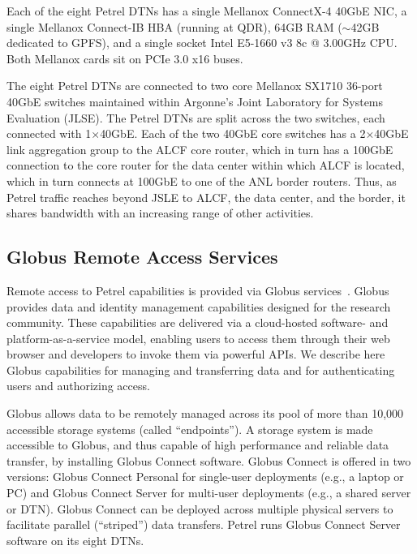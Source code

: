 \documentclass[sigconf]{acmart}
\begin{document}
Each of the eight Petrel DTNs has a single Mellanox ConnectX-4 40GbE NIC, a single Mellanox Connect-IB HBA (running at QDR), 64GB RAM ($\sim$42GB dedicated to GPFS), and a single socket Intel E5-1660 v3 8c @ 3.00GHz CPU. 
Both Mellanox cards sit on PCIe 3.0 x16 buses.

The eight Petrel DTNs are connected to two core Mellanox SX1710 36-port 40GbE switches
maintained within Argonne's Joint Laboratory for Systems Evaluation (JLSE).
The Petrel DTNs are split across the two switches, each connected with 1$\times$40GbE. 
Each of the two 40GbE core switches has a 2$\times$40GbE link aggregation group to the ALCF core router, which in turn has a 100GbE connection to the core router for the data center within
which ALCF is located,
which in turn connects at 100GbE to one of the ANL border routers.
Thus, as Petrel traffic reaches beyond JSLE to ALCF, the data center, and the border,
it shares bandwidth with an increasing range of other activities.

\subsection{Globus Remote Access Services}

Remote access to Petrel capabilities
is provided via Globus services~\cite{Globus2016}.
Globus provides data and identity management capabilities designed for the research community. 
These capabilities are delivered via a cloud-hosted software- and platform-as-a-service model, 
enabling users to access them through their web browser and
developers to invoke them via powerful APIs. 
We describe here Globus capabilities for managing and transferring data and for authenticating users and authorizing access.

Globus allows data to be remotely managed across its pool of more than 10,000 accessible storage systems (called ``endpoints''). 
A storage system is made accessible to Globus, and thus capable of high performance and reliable data transfer, by installing Globus Connect software. 
Globus Connect is offered in two versions: 
Globus Connect Personal for single-user deployments (e.g., a laptop or PC) and Globus Connect Server for multi-user
deployments (e.g., a shared server or DTN). 
Globus Connect can be deployed across multiple physical servers to facilitate
parallel (``striped'') data transfers. 
Petrel runs Globus Connect Server software on its eight DTNs.
\end{document}
